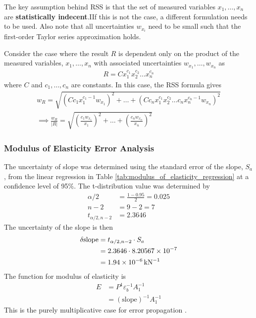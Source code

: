 The key assumption behind RSS is that the set of measured variables $x_1, \ldots, x_n$ are \textbf{statistically indecent}.IIf this is not the case, a different formulation needs to be used. Also note that all uncertainties $w_{x_i}$ need to be small such that the first-order Taylor series approximation holds. 

Consider the case where the result $R$ is dependent only on the product of the measured variables, $x_1, \ldots, x_n$ with associated uncertainties $w_{x_1}, \ldots, w_{x_n}$ as 
\begin{align*}
    R = C x_{1}^{c_1} x_{2}^{c_2} \ldots x_{n}^{c_n}
\end{align*}
where $C$ and $c_1, \ldots, c_n$ are constants. In this case, the RSS formula gives
\begin{align}
    w_{R} = \sqrt{\left(C c_1 x_{1}^{c_1 - 1} w_{x_1}\right)^2 + \ldots + \left(C c_n x_{1}^{c_1} x_{2}^{c_2} \ldots c_n x_{n}^{c_n - 1} w_{x_n}\right)^2} \nonumber \\
    \implies \frac{w_{R}}{|R|} = \sqrt{\left(\frac{c_1 w_{x_1}}{x_1}\right)^2 + \ldots + \left(\frac{c_n w_{x_n}}{x_n}\right)^2} \label{eq:error_propagation_pure_multiplicative}
\end{align}

\subsubsection{Modulus of Elasticity Error Analysis}
The uncertainty of slope was determined using the standard error of the slope, $S_a$, from the linear regression in Table \ref{tab:modulus_of_elasticity_regression} at a confidence level of 95\%. The t-distribution value was determined by 
\begin{align*}
    \alpha/2 &= \frac{1 - 0.95}{2} = 0.025 \\
    n - 2 &= 9 - 2 = 7 \\
    t_{\alpha/2, n-2} &= 2.3646
\end{align*}
The uncertainty of the slope is then \cite{wheeler_ganji}
\begin{align*}
    \delta \text{slope} &= t_{\alpha/2, n-2} \cdot S_a \\
    &= 2.3646 \cdot 8.20567 \times 10^{-7} \\
    &= \qty{1.94E-06}{\per\kilo\newton}
\end{align*}
The function for modulus of elasticity is 
\begin{align*}
    E &= P^{1} \varepsilon_b^{-1} A_1^{-1} \\
    &= (\text{slope})^{-1} A_1^{-1}
\end{align*}
This is the purely multiplicative case for error propagation \cite{wheeler_ganji}. 

